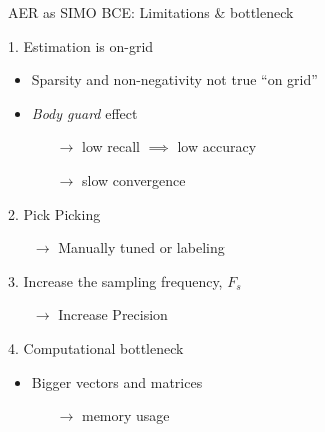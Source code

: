 \begin{frame}{AER as SIMO BCE: Limitations \& bottleneck}

    \begin{block}{1. Estimation is on-grid}
        \begin{itemize}
        \item Sparsity and non-negativity not true ``on grid''

        \item \emph{Body guard} effect \cite{duval2017sparse}
        \begin{itemize}
            \item[$\rightarrow$] low recall $\implies$ low accuracy %
            \item[$\rightarrow$] slow convergence %
        \end{itemize}
        \end{itemize}
    \end{block}

    \begin{block}{2. Pick Picking}
        \begin{itemize}
            \item[$\rightarrow$] Manually tuned or labeling
        \end{itemize}
    \end{block}

    \vfill

    \begin{block}{3. Increase the sampling frequency, $F_s$}
        \begin{itemize}
            \item[$\rightarrow$] Increase Precision
        \end{itemize}
    \end{block}

    \begin{block}{4. Computational bottleneck}
    \begin{itemize}

        \item Bigger vectors and matrices
        \begin{itemize}
            \item[$\longrightarrow$] memory usage
        \end{itemize}

        \vspace*{.5em}


\end{itemize}
\end{block}
\end{frame}
